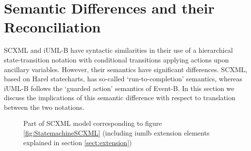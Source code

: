 
\section{Semantic Differences and their Reconciliation}
\label{sect:diff}


SCXML and iUML-B have syntactic similarities in their use of a hierarchical state-transition notation with conditional transitions applying actions upon ancillary variables.
However, their semantics have significant differences. SCXML, based on Harel statecharts, has so-called `run-to-completion' semantics, whereas iUML-B follows the `guarded action' semantics of Event-B.
In this section we discuss the implications of this semantic difference with respect to translation between the two notations.


\begin{figure}[tbp!]
  \caption{Part of SCXML model corresponding to figure \ref{fig:StatemachineSCXML} 
   (including iumlb extension elements explained in section \ref{sect:extension}) } 
  \label{fig:scxml}
\end{figure}


